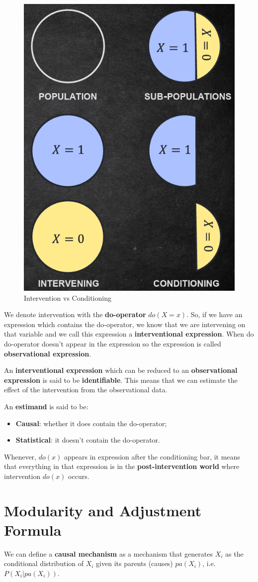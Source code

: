 \begin{figure}[!ht]
      \centering
      \includegraphics[width=0.3\linewidth]{img/causal_models/interventionVSconditioning.png}
      \caption{Intervention vs Conditioning}
      \label{fig:causal}
\end{figure}

We denote intervention with the \textbf{do-operator} $do(X = x)$. So, if we have
an expression which contains the do-operator, we know that we are intervening
on that variable and we call this expression a \textbf{interventional expression}.
When do do-operator doesn't appear in the expression so the expression is called
\textbf{observational expression}.

An \textbf{interventional expression} which can be reduced to an \textbf{observational
      expression} is said to be \textbf{identifiable}. This means that we can
estimate the effect of the intervention from the observational data.

An \textbf{estimand} is said to be:
\begin{itemize}
      \item \textbf{Causal}: whether it does contain the do-operator;
      \item \textbf{Statistical}: it doesn't contain the do-operator.
\end{itemize}

Whenever, $do(x)$ appears in expression after the conditioning bar, it means
that everything in that expression is in the \textbf{post-intervention world}
where intervention $do(x)$ occurs.

\section{Modularity and Adjustment Formula}
We can define a \textbf{causal mechanism} as a mechanism that generates $X_i$ as
the conditional distribution of $X_i$ given its parents (causes) $pa(X_i)$, i.e. $P(X_i | pa(X_i))$.

